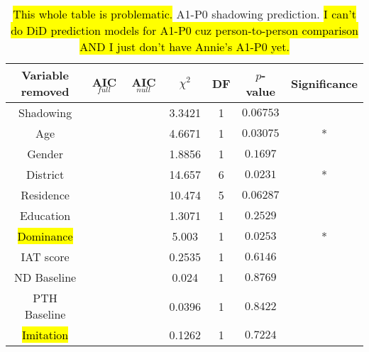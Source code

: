 \begin{table}
\centering
 \begin{tabular}{|c||c|c|c|c|c|c|} 
 \hline
 \textbf{Variable removed} & \textbf{AIC$_{full}$} & \textbf{AIC$_{null}$} & $\chi^2$ & \textbf{DF} & \textbf{$p$-value} & \textbf{Significance}\\ [0.5ex] 
 \hline
  Shadowing & \xxxxx{} & \xxxxx{} & 3.3421 & 1 & $0.06753$ & \\ 
 \hline
 Age & \xxxxx{} & \xxxxx{} & 4.6671 & 1 & $0.03075$ & *\\
 \hline
 Gender & \xxxxx{} & \xxxxx{} & 1.8856 & 1 & $0.1697$ & \\
 \hline
 District & \xxxxx{} & \xxxxx{} & 14.657 & 6 & $0.0231$ & *\\
 \hline
 Residence & \xxxxx{} & \xxxxx{} & 10.474 & 5 & $0.06287$ & \\
 \hline
 Education & \xxxxx{} & \xxxxx{} & 1.3071 & 1 & $0.2529$ & \\
 \hline
 \hl{Dominance} & \xxxxx{} & \xxxxx{} & 5.003 & 1 & $0.0253$ & *\\%
 \hline
 IAT score & \xxxxx{} & \xxxxx{} & 0.2535 & 1 & $0.6146$ & \\
 \hline
 ND Baseline & \xxxxx{} & \xxxxx{} & 0.024 & 1 & $0.8769$ & \\
 \hline
 PTH Baseline & \xxxxx{} & \xxxxx{} & 0.0396 & 1 & $0.8422$ & \\
 \hline
 \hl{Imitation} & \xxxxx{} & \xxxxx{} & 0.1262 & 1 & $0.7224$ & \\%
 \hline
\end{tabular}
\caption{\hl{This whole table is problematic.} A1-P0 shadowing prediction. \hl{I can't do DiD prediction models for A1-P0 cuz person-to-person comparison AND I just don't have Annie's A1-P0 yet.}}
\label{tab:NASshadPredictors}
\end{table}

